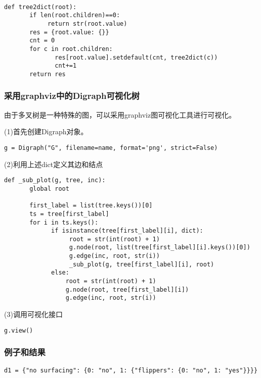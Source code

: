 \documentclass{article}
\begin{document}
\begin{verbatim}

def tree2dict(root):
       if len(root.children)==0:
            return str(root.value)
       res = {root.value: {}}
       cnt = 0
       for c in root.children:
              res[root.value].setdefault(cnt, tree2dict(c))
              cnt+=1
       return res
\end{verbatim}

\subsubsection{采用graphviz中的Digraph可视化树}

由于多叉树是一种特殊的图，可以采用graphviz图可视化工具进行可视化。

(1)首先创建Digraph对象。

\begin{verbatim}
g = Digraph("G", filename=name, format='png', strict=False)
\end{verbatim}

(2)利用上述dict定义其边和结点

\begin{verbatim}
def _sub_plot(g, tree, inc):
       global root

       first_label = list(tree.keys())[0]
       ts = tree[first_label]
       for i in ts.keys():
             if isinstance(tree[first_label][i], dict):
                  root = str(int(root) + 1)
                  g.node(root, list(tree[first_label][i].keys())[0])
                  g.edge(inc, root, str(i))
                  _sub_plot(g, tree[first_label][i], root)
             else:
                 root = str(int(root) + 1)
                 g.node(root, tree[first_label][i])
                 g.edge(inc, root, str(i))
\end{verbatim}

(3)调用可视化接口


\begin{verbatim}
g.view()
\end{verbatim}

\subsubsection{例子和结果}

\begin{verbatim}
d1 = {"no surfacing": {0: "no", 1: {"flippers": {0: "no", 1: "yes"}}}}
\end{verbatim}
\end{document}

